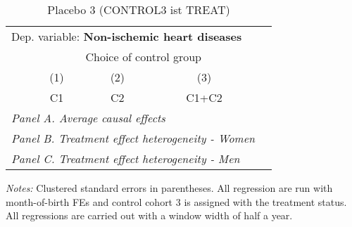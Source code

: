  \begin{table}[H] \centering \begin{threeparttable} \caption{Placebo 3 (CONTROL3 ist TREAT) } {\def\sym#1{\ifmmode^{#1}\else\(^{#1}\)\fi} \begin{tabular}{l*{4}{c}} \toprule \multicolumn{4}{l}{Dep. variable: \textbf{Non-ischemic heart diseases}} \\ & \multicolumn{3}{c}{Choice of control group} \\ \cmidrule(lr){2-4}
            &\multicolumn{1}{c}{(1)}&\multicolumn{1}{c}{(2)}&\multicolumn{1}{c}{(3)}\\
            &\multicolumn{1}{c}{C1}&\multicolumn{1}{c}{C2}&\multicolumn{1}{c}{C1+C2}\\
\midrule
 \multicolumn{4}{l}{\emph{Panel A. Average causal effects}} \\      \midrule\multicolumn{4}{l}{\emph{Panel B. Treatment effect heterogeneity - Women}} \\      \midrule\multicolumn{4}{l}{\emph{Panel C. Treatment effect heterogeneity - Men}} \\      
\bottomrule \end{tabular} } \begin{tablenotes} \item \scriptsize \emph{Notes:} Clustered standard errors in parentheses. All regression are run with month-of-birth FEs and control cohort 3 is assigned with the treatment status. All regressions are carried out with a window width of half a year. \end{tablenotes} \end{threeparttable} \end{table} 
